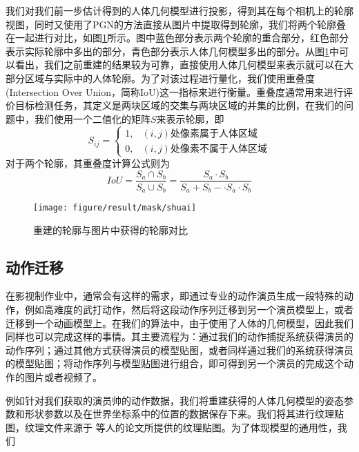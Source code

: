 我们对我们前一步估计得到的人体几何模型进行投影，得到其在每个相机上的轮廓视图，同时又使用了PGN的方法直接从图片中提取得到轮廓，我们将两个轮廓叠在一起进行对比，如图\ref{fig:maskcom}所示。图中蓝色部分表示两个轮廓的重合部分，红色部分表示实际轮廓中多出的部分，青色部分表示人体几何模型多出的部分。从图\ref{fig:maskcom}中可以看出，我们之前重建的结果较为可靠，直接使用人体几何模型来表示就可以在大部分区域与实际中的人体轮廓。为了对该过程进行量化，我们使用重叠度(Intersection Over Union，简称IoU)这一指标来进行衡量。重叠度通常用来进行评价目标检测任务，其定义是两块区域的交集与两块区域的并集的比例，在我们的问题中，我们使用一个二值化的矩阵\(S\)来表示轮廓，即
\begin{equation}
    S_{ij} = \begin{cases}
        1, & \text{\((i,j)\)处像素属于人体区域} \\
        0, & \text{\((i,j)\)处像素不属于人体区域}
    \end{cases}
\end{equation}
对于两个轮廓，其重叠度计算公式则为
\begin{equation}
    IoU = \frac{S_a \cap S_b}{S_a \cup S_b} = \frac{S_a \cdot S_b}{S_a + S_b - \cdot S_a\cdot S_b}
\end{equation}


\begin{figure}[htbp]
    \centering
    \texttt{[image: figure/result/mask/shuai]}
    \caption{\label{fig:maskcom} 重建的轮廓与图片中获得的轮廓对比}
\end{figure}

\subsection{动作迁移}
在影视制作业中，通常会有这样的需求，即通过专业的动作演员生成一段特殊的动作，例如高难度的武打动作，然后将这段动作序列迁移到另一个演员模型上，或者迁移到一个动画模型上。在我们的算法中，由于使用了人体的几何模型，因此我们同样也可以完成这样的事情。其主要流程为：通过我们的动作捕捉系统获得演员的动作序列；通过其他方式获得演员的模型贴图，或者同样通过我们的系统获得演员的模型贴图；将动作序列与模型贴图进行组合，即可得到另一个演员的完成这个动作的图片或者视频了。

例如针对我们获取的演员帅的动作数据，我们将重建获得的人体几何模型的姿态参数和形状参数以及在世界坐标系中的位置的数据保存下来。我们将其进行纹理贴图，纹理文件来源于 等人的论文所提供的纹理贴图\cite{surreal}。为了体现模型的通用性，我们


